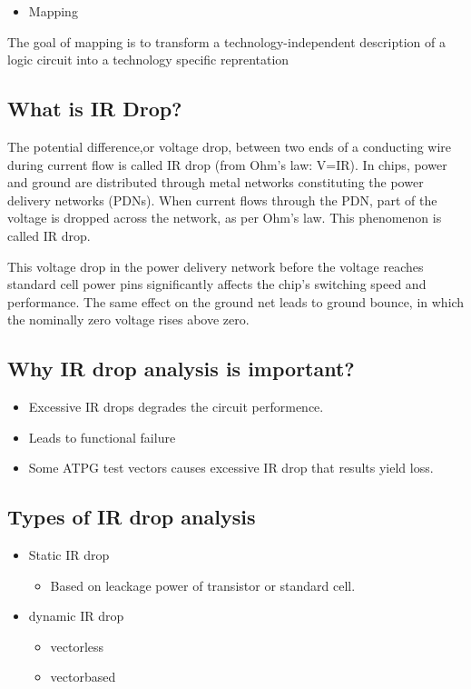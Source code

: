 \documentclass[a4paper]{article}
\begin{document}
\begin{itemize}
\item Mapping
\end{itemize}
The goal of mapping is to transform a technology-independent description of a logic circuit into a technology specific reprentation


\subsection{What is IR Drop?}
\label{sec:org78c9896}

The potential difference,or voltage drop, between two ends of a conducting
wire during current flow is called IR drop (from Ohm’s law: V=IR).
In chips, power and ground are distributed through metal networks
constituting the power delivery networks (PDNs). When current flows
through the PDN, part of the voltage is dropped across the network,
as per Ohm’s law. This phenomenon is called IR drop.

This voltage drop in the power delivery network before
the voltage reaches standard cell
power pins significantly affects the chip's switching speed and performance.
The same effect on the ground net leads to ground bounce, in which
the nominally zero voltage rises above zero.


\subsection{Why IR drop analysis is important?}
\label{sec:orgca941d0}
\begin{itemize}
\item Excessive IR drops degrades the circuit performence.
\item Leads to functional failure
\item Some ATPG test vectors causes excessive IR drop that results yield loss.
\end{itemize}


\subsection{Types of IR drop analysis}
\label{sec:org9bc8d41}
\begin{itemize}
\item Static IR drop
\begin{itemize}
\item Based on leackage power of transistor or standard cell.
\end{itemize}
\item dynamic IR drop
\begin{itemize}
\item vectorless
\item vectorbased
\end{itemize}
\end{itemize}
\end{document}
